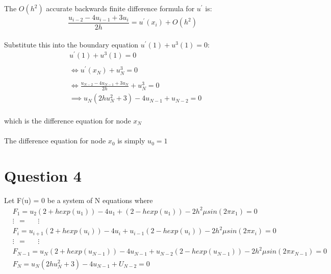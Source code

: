 \documentclass[fleqn]{report}
\begin{document}
The $O(h^2)$ accurate backwards finite difference formula for $u^{\prime}$ is:
\begin{equation}
\frac{u_{i-2} - 4u_{i-1} + 3u_i}{2h} = u^{\prime}(x_i) + O(h^2)
\end{equation}
\\
Substitute this into the boundary equation $u^{\prime}(1) + u^3(1) = 0$:
\begin{equation}
\begin{split}
&u^{\prime}(1) + u^3(1) = 0\\\\
&\iff u^{\prime}(x_N) + u_N^3 = 0\\\\
&\iff \frac{u_{N-2} - 4u_{N-1} + 3u_N}{2h} + u_N^3 = 0\\
&\implies u_N(2hu_N^2 + 3) - 4u_{N-1} + u_{N-2} = 0
\end{split}
\end{equation}
\\
which is the difference equation for node $x_N$\\\\
The difference equation for node $x_0$ is simply $u_0 = 1$

\section{Question 4}

Let F(u) = 0 be a system of N equations where
\begin{equation}
\begin{split} 
&F_1 = u_{2}(2 + hexp(u_1)) - 4u_1 + (2 - hexp(u_1)) - 2h^2\mu sin(2 \pi x_1) = 0  \\
&\vdots \ \ = \ \ \ \ \ \ \                   \vdots\\
&F_i =  u_{i+1}(2 + hexp(u_i)) - 4u_i + u_{i-1}(2 - hexp(u_i)) - 2h^2\mu sin(2 \pi x_i) = 0  \\
&\vdots \ \ = \ \ \ \ \ \ \                   \vdots\\
    &F_{N-1} =  u_{N}(2 + hexp(u_{N-1})) - 4u_{N-1} + u_{N-2}(2 - hexp(u_{N-1})) - 2h^2\mu sin(2 \pi x_{N-1}) = 0\\
&F_N = u_N(2hu^2_N + 3) - 4u_{N-1} + U_{N-2} = 0\\
    \end{split}
\end{equation}
\\
\end{document}
